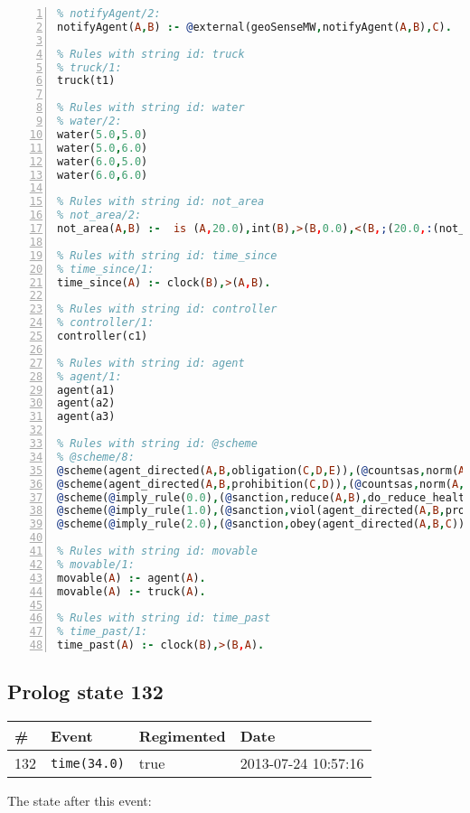 \documentclass[11pt]{article}\usepackage[utf8]{inputenc}\usepackage{geometry}
\begin{document}
\begin{lstlisting}[language=Prolog, numbers=left]
% Rules with string id: notifyAgent
% notifyAgent/2:
notifyAgent(A,B) :- @external(geoSenseMW,notifyAgent(A,B),C).

% Rules with string id: truck
% truck/1:
truck(t1)

% Rules with string id: water
% water/2:
water(5.0,5.0)
water(5.0,6.0)
water(6.0,5.0)
water(6.0,6.0)

% Rules with string id: not_area
% not_area/2:
not_area(A,B) :-  is (A,20.0),int(B),>(B,0.0),<(B,;(20.0,:(not_area(A,B), is (-(B),20.0)))),int(A),>(A,0.0),<(A,;(20.0,:(area(A,B),-(int(A))))),int(B),>(A,0.0),>(B,0.0),<(A,21.0),<(B,21.0).

% Rules with string id: time_since
% time_since/1:
time_since(A) :- clock(B),>(A,B).

% Rules with string id: controller
% controller/1:
controller(c1)

% Rules with string id: agent
% agent/1:
agent(a1)
agent(a2)
agent(a3)

% Rules with string id: @scheme
% @scheme/8:
@scheme(agent_directed(A,B,obligation(C,D,E)),(@countsas,norm(A,B,F,obligation(C,D,E)),F),false,(listTrue(C)),(time_past(D)),false,[plus(viol(agent_directed(A,B,obligation(C,D,E))))|[]],[plus(obey(agent_directed(A,B,obligation(C,D,E))))|[]])
@scheme(agent_directed(A,B,prohibition(C,D)),(@countsas,norm(A,B,E,prohibition(C,D)),E),(listTrue(C)),false,(false),false,[plus(viol(agent_directed(A,B,prohibition(C,D))))|[]],[plus(obey(agent_directed(A,B,prohibition(C,D))))|[]])
@scheme(@imply_rule(0.0),(@sanction,reduce(A,B),do_reduce_health(A,B),notifyAgent(A,changed(status))),true,false,false,false,[min(reduce(A,B))|[]],[])
@scheme(@imply_rule(1.0),(@sanction,viol(agent_directed(A,B,prohibition(C,D))),do_sanction(D)),true,false,false,false,[min(viol(agent_directed(A,B,prohibition(C,D))))|[]],[])
@scheme(@imply_rule(2.0),(@sanction,obey(agent_directed(A,B,C))),true,false,false,false,[min(obey(agent_directed(A,B,C)))|[]],[])

% Rules with string id: movable
% movable/1:
movable(A) :- agent(A).
movable(A) :- truck(A).

% Rules with string id: time_past
% time_past/1:
time_past(A) :- clock(B),>(B,A).

\end{lstlisting}
\clearpage 
\subsection{Prolog state 132}
\begin{table}[ht]
\centering 
\begin{tabular}{l l l l} 
\textbf{\#} & \textbf{Event} & \textbf{Regimented} & \textbf{Date} \\ [0.5ex] 
\hline
132&\texttt{time(34.0)}&true&2013-07-24 10:57:16\\ [1ex] \hline\end{tabular}
\end{table}
The state after this event:
\end{document}

